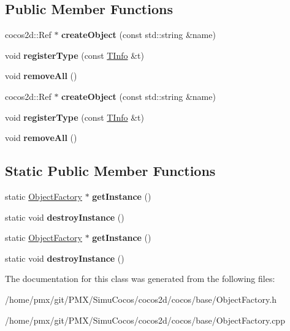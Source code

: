 \subsection*{Public Member Functions}
\begin{DoxyCompactItemize}
\item 
\mbox{\label{classObjectFactory_aaa38c5f10ff16cdf8da96574476fff4d}} 
cocos2d\+::\+Ref $\ast$ {\bfseries create\+Object} (const std\+::string \&name)
\item 
\mbox{\label{classObjectFactory_abad7b84ebd4f4f1bd4c19ce49a000dc5}} 
void {\bfseries register\+Type} (const \hyperlink{structObjectFactory_1_1TInfo}{T\+Info} \&t)
\item 
\mbox{\label{classObjectFactory_ae8c3bb749d2d1bde61e132cd1a3f3e44}} 
void {\bfseries remove\+All} ()
\item 
\mbox{\label{classObjectFactory_a25c8d581200eab234d26024ff4ffe00f}} 
cocos2d\+::\+Ref $\ast$ {\bfseries create\+Object} (const std\+::string \&name)
\item 
\mbox{\label{classObjectFactory_abad7b84ebd4f4f1bd4c19ce49a000dc5}} 
void {\bfseries register\+Type} (const \hyperlink{structObjectFactory_1_1TInfo}{T\+Info} \&t)
\item 
\mbox{\label{classObjectFactory_ae8c3bb749d2d1bde61e132cd1a3f3e44}} 
void {\bfseries remove\+All} ()
\end{DoxyCompactItemize}
\subsection*{Static Public Member Functions}
\begin{DoxyCompactItemize}
\item 
\mbox{\label{classObjectFactory_a75e9b14dadbd5a699c9d5ad2210118c2}} 
static \hyperlink{classObjectFactory}{Object\+Factory} $\ast$ {\bfseries get\+Instance} ()
\item 
\mbox{\label{classObjectFactory_a0f4e737db7a01a2ca61f490ae7e678bf}} 
static void {\bfseries destroy\+Instance} ()
\item 
\mbox{\label{classObjectFactory_a6bf68b5ac593a1d69ee193c10c2a1563}} 
static \hyperlink{classObjectFactory}{Object\+Factory} $\ast$ {\bfseries get\+Instance} ()
\item 
\mbox{\label{classObjectFactory_a1d5e84a04a9fac837768901813720db1}} 
static void {\bfseries destroy\+Instance} ()
\end{DoxyCompactItemize}


The documentation for this class was generated from the following files\+:\begin{DoxyCompactItemize}
\item 
/home/pmx/git/\+P\+M\+X/\+Simu\+Cocos/cocos2d/cocos/base/Object\+Factory.\+h\item 
/home/pmx/git/\+P\+M\+X/\+Simu\+Cocos/cocos2d/cocos/base/Object\+Factory.\+cpp\end{DoxyCompactItemize}
